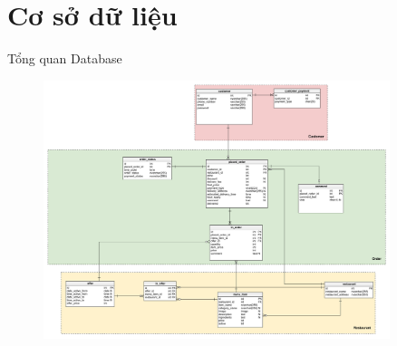 \documentclass[aspectratio=43,xcolor=dvipsnames]{beamer}
\begin{document}
	\section{Cơ sở dữ liệu}
	\begin{frame}{Tổng quan Database}
		\begin{figure}[ht!]
			\centerline{\includegraphics[width=0.9\textwidth]{sql_1.png}}
			\label{fig:ass1}
		\end{figure}
	\end{frame}
\end{document}
